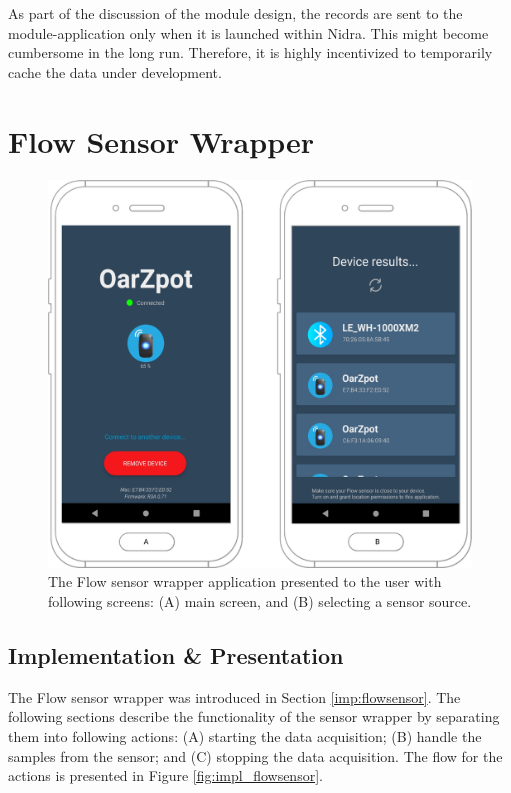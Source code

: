 As part of the discussion of the module design, the records are sent to the module-application only when it is launched within Nidra. This might become cumbersome in the long run. Therefore, it is highly incentivized to temporarily cache the data under development. 


\chapter{Flow Sensor Wrapper}

\begin{figure}[!h]
    \centering
    \includegraphics[scale=0.25]{images/flow_app.pdf}
    \caption{The Flow sensor wrapper application presented to the user with following screens: (A) main screen, and (B) selecting a sensor source.}
    \label{fig:flowapp}
\end{figure}



\section{Implementation \& Presentation}

The Flow sensor wrapper was introduced in Section \ref{imp:flowsensor}. The following sections describe the functionality of the sensor wrapper by separating them into following actions: (A) starting the data acquisition; (B) handle the samples from the sensor; and (C) stopping the data acquisition. The flow for the actions is presented in Figure \ref{fig:impl_flowsensor}.

